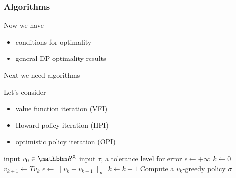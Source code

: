 \documentclass[xcolor=tex,dvipsnames]{beamer}
\begin{document}
\begin{frame}
    \frametitle{Algorithms}


    Now we have 
    \begin{itemize}
        \item conditions for optimality
        \vspace{0.4em}
        \item general DP optimality results
    \end{itemize}


        \vspace{0.4em}
        \vspace{0.4em}
    Next we need algorithms 

        \vspace{0.4em}

    Let's consider
    
    \begin{itemize}
        \item value function iteration (VFI)
        \vspace{0.4em}
        \item Howard policy iteration (HPI)
        \vspace{0.4em}
        \item  optimistic policy iteration (OPI)
    \end{itemize}


\end{frame}



\begin{frame}
    
    {\small 
        \begin{algorithm}[H]
        \DontPrintSemicolon
        \vspace{0.2em}
        input $v_0 \in \RR^\Xsf$ \;
        \vspace{0.2em}
        input $\tau$, a tolerance level for error \;
        \vspace{0.2em}
        $\epsilon \leftarrow +\infty$ \;
        \vspace{0.2em}
        $k \leftarrow 0$ \;
        \vspace{0.2em}
        \While{$\epsilon > \tau $}
        {
        \vspace{0.2em}
            $v_{k+1} \leftarrow Tv_k$ \;
            \vspace{0.2em}
            $\epsilon \leftarrow \| v_k - v_{k+1} \|_\infty$ \;
            \vspace{0.2em}
            $k \leftarrow k + 1$ \;
        \vspace{0.2em}
        }
        \vspace{0.2em}
        Compute a $v_k$-greedy policy $\sigma$ \;
        \vspace{0.2em}
        \Return{$\sigma$}
        \vspace{0.2em}
        \caption{VFI}
        \end{algorithm}
    }

\end{frame}
\end{document}
